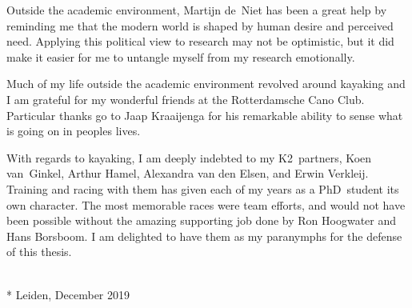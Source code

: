 Outside the academic environment, Martijn de~Niet has been a great help by reminding me that the modern world is shaped by human desire and perceived need.
Applying this political view to research may not be optimistic, but it did make it easier for me to untangle myself from my research emotionally.

Much of my life outside the academic environment revolved around kayaking and I am grateful for my wonderful friends at the Rotterdamsche Cano Club.
Particular thanks go to Jaap Kraaijenga for his remarkable ability to sense what is going on in peoples lives.

With regards to kayaking, I am deeply indebted to my K2~partners, Koen van~Ginkel, Arthur Hamel, Alexandra van den Elsen, and Erwin Verkleij.
Training and racing with them has given each of my years as a PhD~student its own character.
The most memorable races were team efforts, and would not have been possible without the amazing supporting job done by Ron Hoogwater and Hans Borsboom.
I am delighted to have them as my paranymphs for the defense of this thesis.

\begin{flushright}
\theauthor \\*
Leiden, December 2019
\end{flushright}
